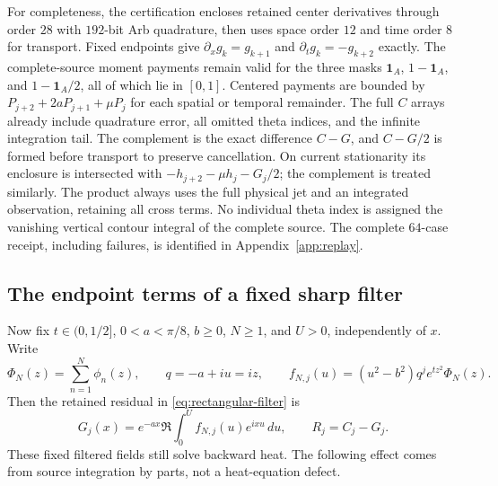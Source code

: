 \documentclass[11pt]{article}
\numberwithin{equation}{section}
\theoremstyle{definition}
\theoremstyle{remark}
\newcommand{\dd}{\,d}
\begin{document}
For completeness, the certification encloses retained center derivatives
through order $28$ with $192$-bit Arb quadrature, then uses space order
$12$ and time order $8$ for transport. Fixed endpoints give
$\partial_xg_k=g_{k+1}$ and $\partial_tg_k=-g_{k+2}$ exactly.
The complete-source moment payments remain valid for the three masks
$\mathbf1_A$, $1-\mathbf1_A$, and $1-\mathbf1_A/2$, all of which
lie in $[0,1]$. Centered payments are bounded by
$P_{j+2}+2aP_{j+1}+\mu P_j$ for each spatial or temporal remainder.
The full $C$ arrays already include quadrature error, all omitted theta
indices, and the infinite integration tail. The complement is the exact
difference $C-G$, and $C-G/2$ is formed before transport to preserve
cancellation. On current stationarity its enclosure is intersected with
$-h_{j+2}-\mu h_j-G_j/2$; the complement is treated similarly.
The product always uses the full physical jet and an integrated
observation, retaining all cross terms. No individual theta index is
assigned the vanishing vertical contour integral of the complete source.
The complete $64$-case receipt, including failures, is identified in
Appendix~\ref{app:replay}.

\subsection{The endpoint terms of a fixed sharp filter}

Now fix $t\in(0,1/2]$, $0<a<\pi/8$, $b\ge0$, $N\ge1$, and
$U>0$, independently of $x$. Write
\[
 \Phi_N(z)=\sum_{n=1}^N\phi_n(z),\qquad q=-a+iu=iz,\qquad
 f_{N,j}(u)=(u^2-b^2)q^j e^{tz^2}\Phi_N(z).
\]
Then the retained residual in \eqref{eq:rectangular-filter} is
\begin{equation}
 G_j(x)=e^{-ax}\Re\int_0^U f_{N,j}(u)e^{ixu}\dd u,\qquad R_j=C_j-G_j.
 \label{eq:sharp-filter-integral}
\end{equation}
These fixed filtered fields still solve backward heat. The following
effect comes from source integration by parts, not a heat-equation defect.
\end{document}
